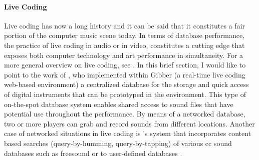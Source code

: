 {	\paragraph{Live Coding}
	Live coding has now a long history and it can be said that it constitutes a fair portion of the computer music scene today. In terms of database performance, the practice of live coding in audio or in video, constitutes a cutting edge that exposes both computer technology and art performance in simultaneity. For a more general overview on live coding, see \parencite{nickcollinsphd, Col03:Liv, Nilson2007, Zmo15:Liv}. In this brief section, I would like to point to the work of \citeauthor{croberts:2014} \parencite{croberts:2014}, who implemented within Gibber (a real-time live coding web-based environment) a centralized database for the storage and quick access of digital instruments that can be prototyped in the environment. This type of on-the-spot database system enables shared access to sound files that have potential use throughout the performance. By means of a networked database, two or more players can grab and record sounds from different locations. Another case of networked situations in live coding is \citeauthor{nime18-Xambo-b}'s system that incorporates content based searches (query-by-humming, query-by-tapping) of various \gls{cc} sound databases such as \gls{freesound} or to user-defined databases \parencite{nime18-Xambo-b}.
}
